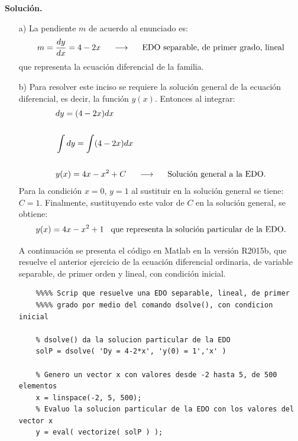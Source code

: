 \documentclass[12pt,a4paper,oneside]{book}
\begin{document}
    \medskip
    \noindent
    \textbf{Solución.} 
    \begin{itemize}
    	\item[a)] La pendiente $m$ de acuerdo al enunciado es:
                    \[
                      m = \frac{dy}{dx} = 4 - 2x \hspace{0.5cm} \longrightarrow \hspace{0.5cm} \text{EDO separable, de primer grado, lineal}
                    \]
                  que representa la ecuación diferencial de la familia.
        \item[b)] Para resolver este inciso se requiere la solución general de la ecuación diferencial, es decir, la función $y(x)$. Entonces al integrar:
        \begin{align*}
        	& dy = (4-2x)dx \\
        	\\& \int dy = \int (4-2x)dx \\
        	\\& y(x) = 4x - x^2 + C \hspace{0.5cm} \longrightarrow \hspace{0.5cm} \text{Solución general a la EDO}.
        \end{align*}
    Para la condición $x=0$, $y=1$ al sustituir en la solución general se tiene: $C=1$.
    Finalmente, sustituyendo este valor de $C$ en la solución general, se obtiene:
    \[
      y(x) = 4x - x^2 + 1  \hspace{0.3cm} \text{que representa la solución particular de la EDO}.
    \]
    
    \newpage
    
    A continuación se presenta el código en Matlab en la versión R2015b, que resuelve el anterior ejercicio de la ecuación diferencial ordinaria, de variable separable, de primer orden y lineal, con condición inicial. \\
            
    \begin{lstlisting}[frame=single]
	%%%%%%%%%%%%%%%%%%%%% Matlab R2015b %%%%%%%%%%%%%%%%%%%%%
	%%%% Scrip que resuelve una EDO separable, lineal, de primer 
	%%%% grado por medio del comando dsolve(), con condicion inicial
	
	% dsolve() da la solucion particular de la EDO
	solP = dsolve( 'Dy = 4-2*x', 'y(0) = 1','x' )
	
	% Genero un vector x con valores desde -2 hasta 5, de 500 elementos
	x = linspace(-2, 5, 500);
	% Evaluo la solucion particular de la EDO con los valores del vector x
	y = eval( vectorize( solP ) );
	

\end{lstlisting}
\end{itemize}
\end{document}
